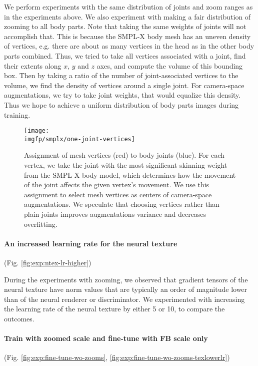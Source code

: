 We perform experiments with the same distribution of joints and zoom ranges as in the experiments above. We also experiment with making a fair distribution of zooming to all body parts. Note that taking the same weights of joints will not accomplish that. This is because the SMPL-X body mesh has an uneven density of vertices, e.g. there are about as many vertices in the head as in the other body parts combined. Thus, we  tried to take all vertices associated with a joint, find their extents along $x$, $y$ and $z$ axes, and compute the volume of this bounding box. Then by taking a ratio of the number of joint-associated vertices to the volume, we find the density of vertices around a single joint. For camera-space augmentations, we try to take joint weights, that would equalize this density. Thus we hope to achieve a uniform distribution of body parts images during training.

\begin{figure}[!htpb]
	\centering
	\texttt{[image: \\imgfp/smplx/one-joint-vertices]}%
	\caption{Assignment of mesh vertices (red) to body joints (blue). For each vertex, we take the joint with the most significant skinning weight from the SMPL-X body model, which determines how the movement of the joint affects the given vertex's movement. We use this assignment to select mesh vertices as centers of camera-space augmentations. We speculate that choosing vertices rather than plain joints improves augmentations variance and decreases overfitting.}
	\label{fig:smplx-vert2joint}
\end{figure}

\vspace{-15pt}\paragraph{An increased learning rate for the neural texture}(Fig. \ref{fig:exp:ntex-lr-higher})\mbox{}\nopagebreak

During the experiments with zooming, we observed that gradient tensors of the neural texture have norm values that are typically an order of magnitude lower than of the neural renderer or discriminator. We experimented with increasing the learning rate of the neural texture by either 5 or 10, to compare the outcomes.

\vspace{-15pt}\paragraph{Train with zoomed scale and fine-tune with FB scale only}(Fig. \ref{fig:exp:fine-tune-wo-zooms}, \ref{fig:exp:fine-tune-wo-zooms-texlowerlr})\mbox{}\nopagebreak

